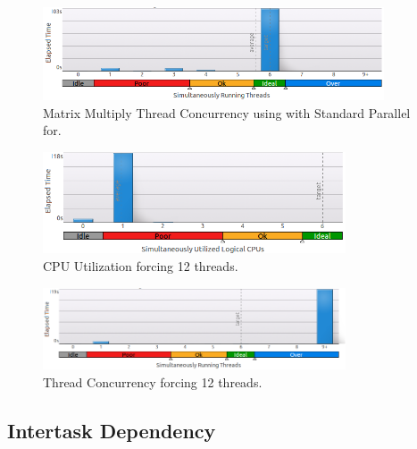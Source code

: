 \documentclass[journal,10pt,onecolumn,draftcls]{IEEEtran}
\begin{document}
\begin{figure}[htb]
\label{fig:matrix_wo_dynamic_schedule_concurrency}
\begin{center}
\includegraphics[width=0.9\textwidth]{figures/matrix_without_dynamic_schedule_thread_concurrency.png}
\caption{Matrix Multiply Thread Concurrency using with Standard Parallel for.}
\end{center}
\end{figure}



\begin{figure}[htb]
\label{fig:12_threaded_matrix_cpu_usage}
\begin{center}
\includegraphics[width=0.8\textwidth]{figures/12_threaded_matrix_thread_cpu_usage_histogram.png}
\caption{CPU Utilization forcing 12 threads.}
\end{center}
\end{figure}

\begin{figure}[htb]
\label{fig:12_threaded_matrix_concurrent}
\begin{center}
\includegraphics[width=0.8\textwidth]{figures/12_threaded_matrix_thread_concurrent_histogram.png}
\caption{Thread Concurrency forcing 12 threads.}
\end{center}
\end{figure}

\subsection{Intertask Dependency}
\end{document}
